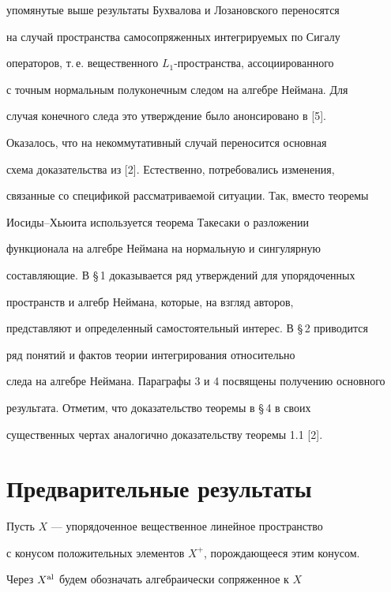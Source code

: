 упомянутые выше результаты Бухвалова и Лозановского переносятся 


на случай пространства самосопряженных интегрируемых по Сигалу 


операторов, т.\,е. вещественного $L_1$-пространства, ассоциированного 


с точным нормальным полуконечным следом на алгебре Неймана. Для 


случая конечного следа это утверждение было анонсировано в [5].





Оказалось, что на некоммутативный случай переносится основная 


схема доказательства из [2]. Естественно, потребовались изменения, 


связанные со спецификой рассматриваемой ситуации. Так, вместо теоремы 


Иосиды--Хьюита используется теорема Такесаки о разложении 


функционала на алгебре Неймана на нормальную и сингулярную 


составляющие. В \S\,1 доказывается ряд утверждений для упорядоченных 


пространств и алгебр Неймана, которые, на взгляд авторов, 


представляют и определенный самостоятельный интерес. В \S\,2 приводится


ряд понятий и фактов теории интегрирования относительно 


следа на алгебре Неймана. Параграфы 3 и 4 посвящены получению основного 


результата. Отметим, что доказательство теоремы в \S\,4 в своих 


существенных чертах аналогично доказательству теоремы 1.1 [2].





\section{Предварительные результаты}





Пусть $X$ --- упорядоченное вещественное линейное пространство 


с конусом положительных элементов $X^+$, порождающееся этим конусом. 


Через $X^{\operatorname{al}}$ будем обозначать алгебраически сопряженное к $X$ 



